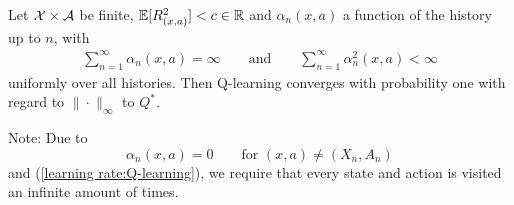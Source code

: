 \begin{corollary}
    Let \(\mathcal{X}\times\mathcal{A}\) be finite, \(\mathbb{E}[R_{(x,a)}^2]<c\in\mathbb{R}\) and \(\alpha_n(x,a)\) a function of the history up to \(n\), with
    \begin{align}\label{learning rate:Q-learning}
        \sum_{n=1}^\infty \alpha_n(x,a)=\infty \qquad \text{and}\qquad \sum_{n=1}^\infty \alpha_n^2(x,a)<\infty
    \end{align}
    uniformly over all histories.
    Then Q-learning converges with probability one with regard to \(\|\cdot\|_\infty\) to \(Q^*\). 
\end{corollary}
Note: Due to 
    \[
        \alpha_n(x,a)=0 \qquad \text{for } (x,a)\neq (X_n,A_n) 
    \]
    and (\ref{learning rate:Q-learning}), we require that every state and action is visited an infinite amount of times.
